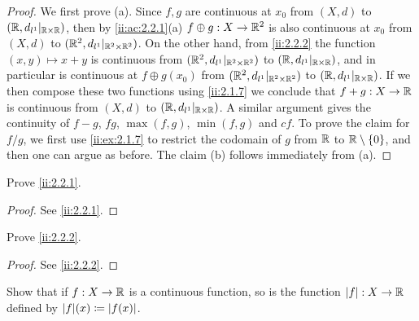 \begin{proof}
  We first prove (a). Since \(f, g\) are continuous at \(x_0\) from \((X, d)\) to \((\mathbb{R}, d_{l^1}|_{\mathbb{R} \times \mathbb{R}})\), then by \cref{ii:ac:2.2.1}(a) \(f \oplus g : X \to \mathbb{R}^2\) is also continuous at \(x_0\) from \((X, d)\) to \((\mathbb{R}^2, d_{l^1}|_{\mathbb{R}^2 \times \mathbb{R}^2})\).
  On the other hand, from \cref{ii:2.2.2} the function \((x, y) \mapsto x + y\) is continuous from \((\mathbb{R}^2, d_{l^1}|_{\mathbb{R}^2 \times \mathbb{R}^2})\) to \((\mathbb{R}, d_{l^1}|_{\mathbb{R} \times \mathbb{R}})\), and in particular is continuous at \(f \oplus g(x_0)\) from \((\mathbb{R}^2, d_{l^1}|_{\mathbb{R}^2 \times \mathbb{R}^2})\) to \((\mathbb{R}, d_{l^1}|_{\mathbb{R} \times \mathbb{R}})\).
  If we then compose these two functions using \cref{ii:2.1.7} we conclude that \(f + g : X \to \mathbb{R}\) is continuous from \((X, d)\) to \((\mathbb{R}, d_{l^1}|_{\mathbb{R} \times \mathbb{R}})\).
  A similar argument gives the continuity of \(f - g\), \(fg\), \(\max(f, g)\), \(\min(f, g)\) and \(cf\).
  To prove the claim for \(f / g\), we first use \cref{ii:ex:2.1.7} to restrict the codomain of \(g\) from \(\mathbb{R}\) to \(\mathbb{R} \setminus \left\lbrace0\right\rbrace\), and then one can argue as before.
  The claim (b) follows immediately from (a).
\end{proof}

\exercisesection

\begin{ex}\label{ii:ex:2.2.1}
  Prove \cref{ii:2.2.1}.
\end{ex}

\begin{proof}
  See \cref{ii:2.2.1}.
\end{proof}

\begin{ex}\label{ii:ex:2.2.2}
  Prove \cref{ii:2.2.2}.
\end{ex}

\begin{proof}
  See \cref{ii:2.2.2}.
\end{proof}

\begin{ex}\label{ii:ex:2.2.3}
  Show that if \(f : X \to \mathbb{R}\) is a continuous function, so is the function \(\left\lvert f\right\rvert : X \to \mathbb{R}\) defined by \(\abs{f}(x) \coloneqq \abs{f(x)}\).
\end{ex}

